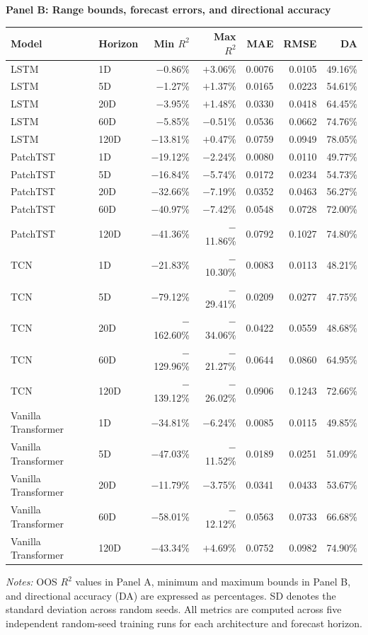 \documentclass[12pt,twoside]{ord}
\begin{document}
\begin{table}[htbp]
\vspace{8pt}
\setlength{\tabcolsep}{3.2pt}
\textbf{Panel B: Range bounds, forecast errors, and directional accuracy}\\[3pt]
\begin{tabular}{llrrrrr}
\hline
Model & Horizon & Min $R^2$ & Max $R^2$ & MAE & RMSE & DA \\
\hline
LSTM & 1D   & $-$0.86\% & $+$3.06\% & 0.0076 & 0.0105 & 49.16\% \\
LSTM & 5D   & $-$1.27\% & $+$1.37\% & 0.0165 & 0.0223 & 54.61\% \\
LSTM & 20D  & $-$3.95\% & $+$1.48\% & 0.0330 & 0.0418 & 64.45\% \\
LSTM & 60D  & $-$5.85\% & $-$0.51\% & 0.0536 & 0.0662 & 74.76\% \\
LSTM & 120D & $-$13.81\% & $+$0.47\% & 0.0759 & 0.0949 & 78.05\% \\
\hline
PatchTST & 1D   & $-$19.12\% & $-$2.24\% & 0.0080 & 0.0110 & 49.77\% \\
PatchTST & 5D   & $-$16.84\% & $-$5.74\% & 0.0172 & 0.0234 & 54.73\% \\
PatchTST & 20D  & $-$32.66\% & $-$7.19\% & 0.0352 & 0.0463 & 56.27\% \\
PatchTST & 60D  & $-$40.97\% & $-$7.42\% & 0.0548 & 0.0728 & 72.00\% \\
PatchTST & 120D & $-$41.36\% & $-$11.86\% & 0.0792 & 0.1027 & 74.80\% \\
\hline
TCN & 1D   & $-$21.83\% & $-$10.30\% & 0.0083 & 0.0113 & 48.21\% \\
TCN & 5D   & $-$79.12\% & $-$29.41\% & 0.0209 & 0.0277 & 47.75\% \\
TCN & 20D  & $-$162.60\% & $-$34.06\% & 0.0422 & 0.0559 & 48.68\% \\
TCN & 60D  & $-$129.96\% & $-$21.27\% & 0.0644 & 0.0860 & 64.95\% \\
TCN & 120D & $-$139.12\% & $-$26.02\% & 0.0906 & 0.1243 & 72.66\% \\
\hline
Vanilla Transformer & 1D   & $-$34.81\% & $-$6.24\% & 0.0085 & 0.0115 & 49.85\% \\
Vanilla Transformer & 5D   & $-$47.03\% & $-$11.52\% & 0.0189 & 0.0251 & 51.09\% \\
Vanilla Transformer & 20D  & $-$11.79\% & $-$3.75\% & 0.0341 & 0.0433 & 53.67\% \\
Vanilla Transformer & 60D  & $-$58.01\% & $-$12.12\% & 0.0563 & 0.0733 & 66.68\% \\
Vanilla Transformer & 120D & $-$43.34\% & $+$4.69\% & 0.0752 & 0.0982 & 74.90\% \\
\hline
\end{tabular}
\par\vspace{4pt}\parbox{\linewidth}{\fontsize{9pt}{12pt}\selectfont\textit{Notes:} OOS $R^2$ values in Panel A, minimum and maximum bounds in Panel B, and directional accuracy (DA) are expressed as percentages. SD denotes the standard deviation across random seeds. All metrics are computed across five independent random-seed training runs for each architecture and forecast horizon.}
\end{table}
\end{document}
